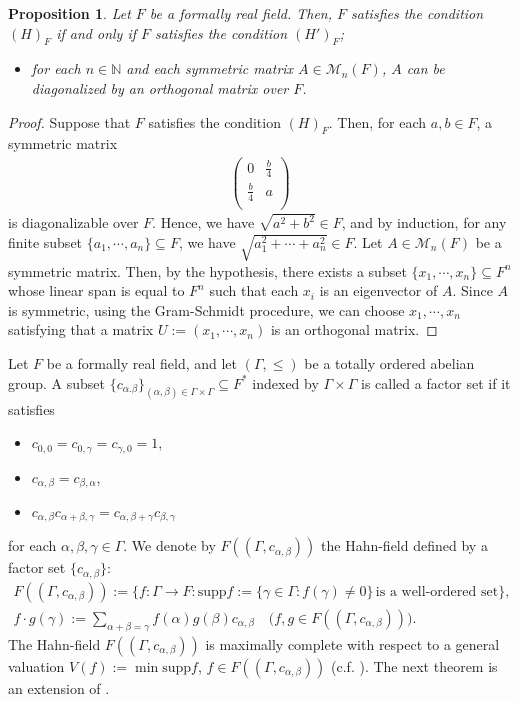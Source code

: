 \documentclass[12pt]{amsart}
\theoremstyle{plain}
\newtheorem{prop} {Proposition} [section]
\theoremstyle{definition}
\begin{document}
\begin{prop} \label{b1}
  Let $F$ be a formally real field. Then, $F$ satisfies the condition $(H)_F$ if and only if $F$ satisfies the condition $(H')_F$;
  \begin{itemize}
    \item[$(H')_F$] for each $n \in \mathbb{N}$ and each symmetric matrix $A \in \mathcal{M}_n(F)$, $A$ can be diagonalized by an orthogonal matrix over $F$.
  \end{itemize}
\end{prop}
\begin{proof}
  Suppose that $F$ satisfies the condition $(H)_F$. Then, for each $a, b \in F$, a symmetric matrix
  \begin{align*}
  \begin{pmatrix}
    0 & \frac{b}{4} \\
    \frac{b}{4} & a \\
  \end{pmatrix}
  \end{align*}
  is diagonalizable over $F$. Hence, we have $\sqrt{a^2 + b^2} \in F$, and by induction, for any finite subset $\{a_1, \cdots, a_n \} \subseteq F$, we have $\sqrt{a_1^2 + \cdots + a_n^2} \in F$. Let $A \in \mathcal{M}_n(F)$ be a symmetric matrix. Then, by the hypothesis, there exists a subset $\{x_1, \cdots, x_n \} \subseteq F^n$ whose linear span is equal to $F^n$ such that each $x_i$ is an eigenvector of $A$. Since $A$ is symmetric, using the Gram-Schmidt procedure, we can choose $x_1, \cdots, x_n$ satisfying that a matrix $U := (x_1, \cdots, x_n)$ is an orthogonal matrix.
\end{proof}

Let $F$ be a formally real field, and let $(\Gamma, \le)$ be a totally ordered abelian group. A subset $\{c_{\alpha. \beta}\}_{(\alpha,\beta) \in \Gamma \times \Gamma} \subseteq F^*$ indexed by $\Gamma \times \Gamma$ is called a factor set if it satisfies
\begin{itemize}
  \item $c_{0,0} = c_{0,\gamma} = c_{\gamma,0} = 1$,
  \item $c_{\alpha, \beta} = c_{\beta, \alpha}$,
  \item $c_{\alpha, \beta} c_{\alpha + \beta, \gamma} = c_{\alpha, \beta + \gamma} c_{\beta, \gamma}$
\end{itemize}
for each $\alpha, \beta, \gamma \in \Gamma$. We denote by $F((\Gamma, c_{\alpha, \beta}))$ the Hahn-field defined by a factor set $\{c_{\alpha, \beta}\}$:
\begin{gather*}
  F((\Gamma, c_{\alpha, \beta})) := \big\{f : \Gamma \to F : \text{supp}f := \{\gamma \in \Gamma : f(\gamma) \neq 0\} \, \text{is a well-ordered set} \big\}, \\
  f \cdot g (\gamma) := \sum_{\alpha + \beta = \gamma}f(\alpha)g(\beta) c_{\alpha, \beta} \quad \big(f,g \in F((\Gamma, c_{\alpha, \beta})) \big).
\end{gather*}
The Hahn-field $F((\Gamma, c_{\alpha, \beta}))$ is maximally complete with respect to a general valuation $V(f) := \min \text{supp}f$, $f \in F((\Gamma, c_{\alpha, \beta}))$ (c.f. \cite{val}). The next theorem is an extension of \cite[Theorem 1]{spect}.
\end{document}
